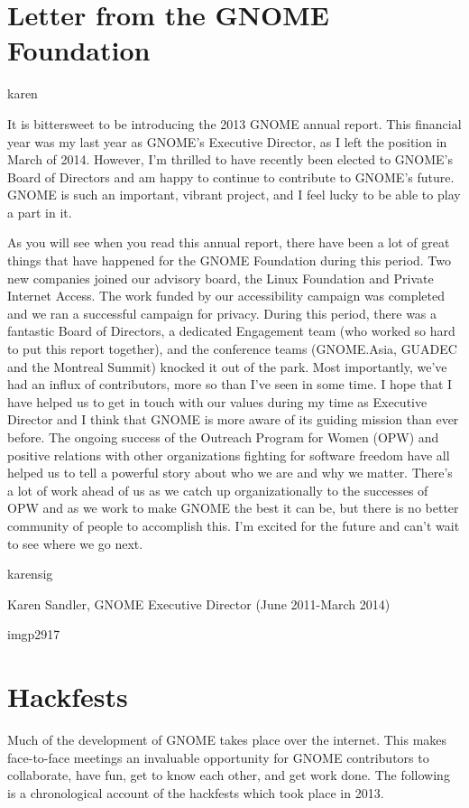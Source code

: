 \documentclass{scrreprt}
\begin{document}
\section{Letter from the GNOME Foundation}

karen

It is bittersweet to be introducing the 2013 GNOME annual report. This financial year was my last year as GNOME's Executive Director, as I left the position in March of 2014. However, I'm thrilled to have recently been elected to GNOME's Board of Directors and am happy to continue to contribute to GNOME's future. GNOME is such an important, vibrant project, and I feel lucky to be able to play a part in it.

As you will see when you read this annual report, there have been a lot of great things that have happened for the GNOME Foundation during this period. Two new companies joined our advisory board, the Linux Foundation and Private Internet Access.  The work funded by our accessibility campaign was completed and we ran a successful campaign for privacy. During this period, there was a fantastic Board of Directors, a dedicated Engagement team (who worked so hard to put this report together), and the conference teams (GNOME.Asia, GUADEC and the Montreal Summit) knocked it out of the park. Most importantly, we’ve had an influx of contributors, more so than I’ve seen in some time.
I hope that I have helped us to get in touch with our values during my time as Executive Director and I think that GNOME is more aware of its guiding mission than ever before. The ongoing success of the Outreach Program for Women (OPW) and positive relations with other organizations fighting for software freedom have all helped us to tell a powerful story about who we are and why we matter.
There's a lot of work ahead of us as we catch up organizationally to the successes of OPW and as we work to make GNOME the best it can be, but there is no better community of people to accomplish this.
I’m excited for the future and can’t wait to see where we go next.

karensig

Karen Sandler, GNOME Executive Director (June 2011-March 2014)



imgp2917


\section{Hackfests}

Much of the development of GNOME takes place over the internet. This makes face-to-face meetings an invaluable opportunity for GNOME contributors to collaborate, have fun, get to know each other, and get work done. The following is a chronological account of the hackfests which took place in 2013.
\end{document}
